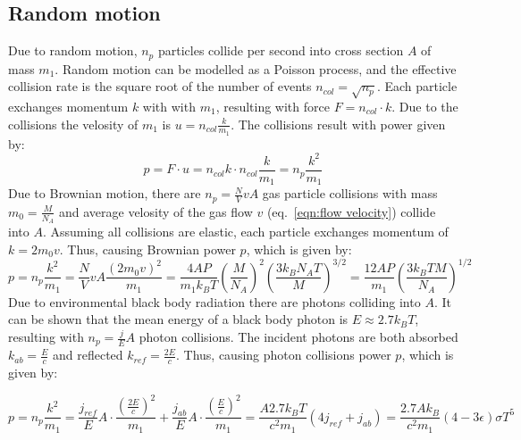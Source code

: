 \documentclass[\main/master.tex]{subfiles}
\begin{document}
\subsection{Random motion}
Due to random motion, $n_p$ particles collide per second into cross section $A$ of mass $m_1$. Random motion can be modelled as a Poisson process, and the effective collision rate is the square root of the number of events $n_{col} = \sqrt{n_p}$. Each particle exchanges momentum $k$ with with $m_1$, resulting with force $F = n_{col}\cdot k$. Due to the collisions the velosity of $m_1$ is $ u = n_{col}\frac{k}{m_1}$. The collisions result with power given by:
\begin{equation}
p = F\cdot u =  n_{col}k \cdot n_{col}\frac{k}{m_1} =  n_p\frac{ k^2}{m_1}
\label{eqn:net power}
\end{equation}
Due to Brownian motion, there are $n_p= \frac{N}{V}v A$  gas particle collisions with mass $m_0 = \frac{M}{N_A}$ and average velosity of the gas flow $v$ (eq.~\ref{eqn:flow velocity}) collide into $A$. Assuming all collisions are elastic, each particle exchanges momentum of $ k = 2 m_0 v$. Thus, causing Brownian power $p$, which is given by:
\begin{equation}
p =  n_p\frac{ k^2}{m_1} =  \frac{N}{V} v A\frac{ (2 m_0 v)^2}{m_1} = \frac{4AP }{m_1k_B T}(\frac{M}{N_A})^2 (\frac{3 k_B N_A T}{M})^{3/2} =  \frac{12AP }{m_1 } (\frac{3 k_B  T M}{N_A})^{1/2}
\label{eqn:brownian net power}
\end{equation}
Due to environmental black body radiation there are photons colliding into $A$. It can be shown that the mean energy of a black body photon is $E\approx 2.7k_B T$, resulting with $n_p = \frac{j}{E}A$ photon collisions. The incident photons are both absorbed $k_{ab} = \frac{E}{c} $ and reflected $k_{ref} = \frac{2E}{c} $. Thus, causing photon collisions power $p$, which is given by:

\begin{equation}
p =  n_p\frac{ k^2}{m_1} = \frac{j_{ref}}{E}A\cdot\frac{ (\frac{2E}{c})^2}{m_1} +\frac{j_{ab}}{E}A\cdot\frac{ (\frac{E}{c})^2}{m_1} = \frac{ A 2.7 k_B T}{ c^2 m_1} (4j_{ref}+j_{ab}) =\frac{2.7A k_B}{ c^2 m_1} (4-3\epsilon)\sigma T^5 
\label{eqn:photon collision power}
\end{equation}
\end{document}
